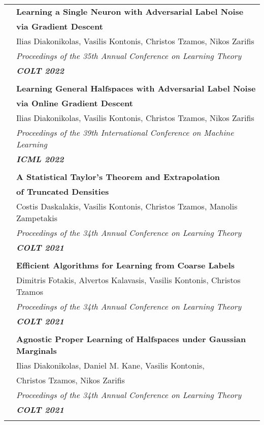 \documentclass[letterpaper,11pt,oneside]{article}
\begin{document}
\begin{longtable}{@{} l l}
 &\textbf{Learning a Single Neuron with Adversarial Label Noise}\\
 & \textbf{via Gradient Descent}\\
 & Ilias Diakonikolas, Vasilis Kontonis, Christos Tzamos, Nikos Zarifis \\
 & \emph{Proceedings of the 35th Annual Conference on Learning Theory}\\
 & \emph{\textbf{COLT 2022}} \\
 & \\


 &\textbf{Learning General Halfspaces with Adversarial Label Noise}\\
 & \textbf{via Online Gradient Descent}\\
 & Ilias Diakonikolas, Vasilis Kontonis, Christos Tzamos, Nikos Zarifis \\
 & \emph{Proceedings of the 39th International Conference on Machine Learning} \\
 & \emph{\textbf{ICML 2022}} \\
 & \\


 &\textbf{A Statistical Taylor's Theorem and Extrapolation}\\
 & \textbf{of Truncated Densities}\\
 & Costis Daskalakis, Vasilis Kontonis, Christos Tzamos, Manolis Zampetakis \\
 & \emph{Proceedings of the 34th Annual Conference on Learning Theory} \\
 & \emph{\textbf{COLT 2021}} \\
 & \\

 &\textbf{Efficient Algorithms for Learning from Coarse Labels}\\
 &  Dimitris Fotakis, Alvertos Kalavasis, Vasilis Kontonis, Christos Tzamos \\
 & \emph{Proceedings of the 34th Annual Conference on Learning Theory} \\
 & \emph{\textbf{COLT 2021}} \\
 & \\

&\textbf{Agnostic Proper Learning of Halfspaces under Gaussian Marginals}\\
& Ilias Diakonikolas, Daniel M. Kane, Vasilis Kontonis,\\
& Christos Tzamos, Nikos Zarifis \\
& \emph{Proceedings of the 34th Annual Conference on Learning Theory} \\
& \emph{\textbf{COLT 2021}} \\
& \\


\end{longtable}
\end{document}
